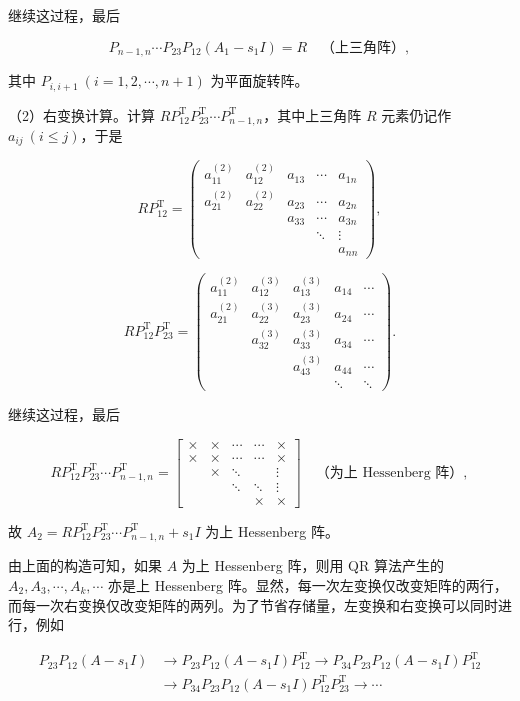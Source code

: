 继续这过程，最后

\[
P_{n-1,n}\cdots P_{23}P_{12}(A_1-s_1I)=R\quad\text{（上三角阵）},
\]

其中 \(P_{i,i+1}\ (i=1,2,\cdots,n+1)\) 为平面旋转阵。

（2）右变换计算。计算 \(RP_{12}^{\mathrm T}P_{23}^{\mathrm T}\cdots P_{n-1,n}^{\mathrm T}\)，其中上三角阵 \(R\) 元素仍记作 \(a_{ij}\ (i\leq j)\)，于是

\[
RP_{12}^{\mathrm T}=\begin{pmatrix}
a_{11}^{(2)}&a_{12}^{(2)}&a_{13}&\cdots&a_{1n}\\
a_{21}^{(2)}&a_{22}^{(2)}&a_{23}&\cdots&a_{2n}\\
&&a_{33}&\cdots&a_{3n}\\
&&&\ddots&\vdots\\
&&&&a_{nn}
\end{pmatrix},
\]

\[
RP_{12}^{\mathrm T}P_{23}^{\mathrm T}=\begin{pmatrix}
a_{11}^{(2)}&a_{12}^{(3)}&a_{13}^{(3)}&a_{14}&\cdots\\
a_{21}^{(2)}&a_{22}^{(3)}&a_{23}^{(3)}&a_{24}&\cdots\\
&a_{32}^{(3)}&a_{33}^{(3)}&a_{34}&\cdots\\
&&a_{43}^{(3)}&a_{44}&\cdots\\
&&&\ddots&\ddots
\end{pmatrix}.
\]

继续这过程，最后

\[
RP_{12}^{\mathrm T}P_{23}^{\mathrm T}\cdots P_{n-1,n}^{\mathrm T}
=\begin{bmatrix}
\times&\times&\cdots&\cdots&\times\\
\times&\times&\cdots&\cdots&\times\\
&\times&\ddots&&\vdots\\
&&\ddots&\ddots&\vdots\\
&&&\times&\times
\end{bmatrix}\quad\text{（为上 Hessenberg 阵）},
\]

故 \(A_2=RP_{12}^{\mathrm T}P_{23}^{\mathrm T}\cdots P_{n-1,n}^{\mathrm T}+s_1I\) 为上 Hessenberg 阵。

由上面的构造可知，如果 \(A\) 为上 Hessenberg 阵，则用 QR 算法产生的 \(A_2,A_3,\cdots,A_k,\cdots\) 亦是上 Hessenberg 阵。显然，每一次左变换仅改变矩阵的两行，而每一次右变换仅改变矩阵的两列。为了节省存储量，左变换和右变换可以同时进行，例如

\[
\begin{aligned}
P_{23}P_{12}(A-s_1I)&\to P_{23}P_{12}(A-s_1I)P_{12}^{\mathrm T}
\to P_{34}P_{23}P_{12}(A-s_1I)P_{12}^{\mathrm T}\\
&\to P_{34}P_{23}P_{12}(A-s_1I)P_{12}^{\mathrm T}P_{23}^{\mathrm T}\to\cdots
\end{aligned}
\]

